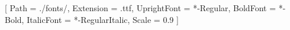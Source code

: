 \usepackage{graphicx}
\usepackage{xcolor}
\usepackage[hidelinks]{hyperref}
\usepackage{agda}
\usepackage{fontspec}

\setmonofont{JuliaMono}[
    Path       = ./fonts/,
    Extension  = .ttf,
    UprightFont = *-Regular,
    BoldFont    = *-Bold,
    ItalicFont  = *-RegularItalic,
    Scale       = 0.9
]

\linespread{1.2}

\graphicspath{ {./graphics/} }